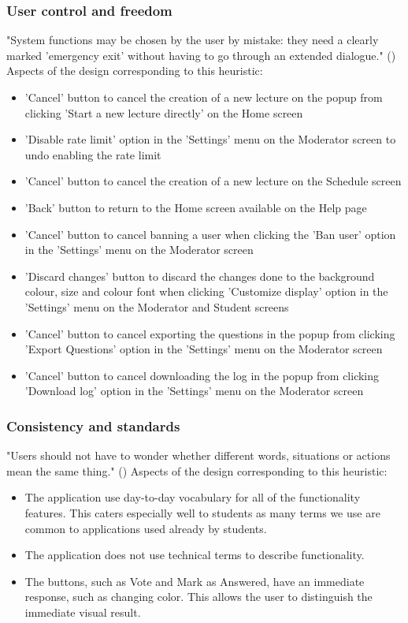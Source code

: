 \documentclass{article}
\begin{document}
\subsubsection{User control and freedom\label{3rdheuristic}}
"System functions may be chosen by the user by mistake: they need a clearly marked 'emergency exit' without having to go through an extended dialogue." (\textcite{Nielsen1994})
Aspects of the design corresponding to this heuristic:
\begin{itemize}
\item 'Cancel' button to cancel the creation of a new lecture on the popup from clicking 'Start a new lecture directly' on the Home screen
\item 'Disable rate limit' option in the 'Settings' menu on the Moderator screen to undo enabling the rate limit
\item 'Cancel' button to cancel the creation of a new lecture on the Schedule screen
\item 'Back' button to return to the Home screen available on the Help page
\item 'Cancel' button to cancel banning a user when clicking the 'Ban user' option in the 'Settings' menu on the Moderator screen
\item 'Discard changes' button to discard the changes done to the background colour, size and colour font when clicking 'Customize display' option in the 'Settings' menu on the Moderator and Student screens
\item 'Cancel' button to cancel exporting the questions in the popup from clicking 'Export Questions' option in the 'Settings' menu on the Moderator screen
\item 'Cancel' button to cancel downloading the log in the popup from clicking 'Download log' option in the 'Settings' menu on the Moderator screen
\end{itemize}

\subsubsection{Consistency and standards\label{4thheuristic}}
"Users should not have to wonder whether different words, situations or actions mean the same thing." (\textcite{Nielsen1994})
Aspects of the design corresponding to this heuristic:
\begin{itemize}
\item The application use day-to-day vocabulary for all of the functionality features. This caters especially well to students as many terms we use are common to applications used already by students. 
\item The application does not use technical terms to describe functionality. 
\item The buttons, such as Vote and Mark as Answered, have an immediate response, such as changing color. This allows the user to distinguish the immediate visual result. 
\end{itemize}
\end{document}
